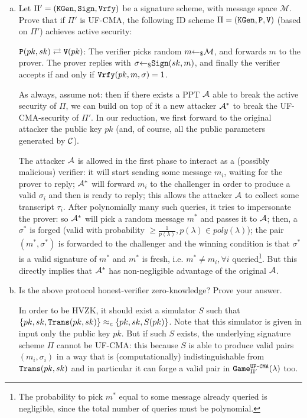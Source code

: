 \begin{enumerate}[(a)]
	\item Let $\Pi' = (\texttt{KGen}, \texttt{Sign}, \texttt{Vrfy})$ be a signature scheme, with message space $\mathcal{M}$. Prove that if $\Pi'$ is UF-CMA, the following ID scheme $\Pi = (\texttt{KGen}, \texttt{P}, \texttt{V})$ (based on $\Pi'$) achieves active security:

	      $\texttt{P}(pk, sk) \rightleftarrows \texttt{V}(pk)$: The verifier picks random $m {\leftarrow_\$} \mathcal{M}$, and forwards $m$ to the prover. The prover replies with $\sigma {\leftarrow_\$} \texttt{Sign}(sk, m)$, and finally the verifier accepts if and only if $\texttt{Vrfy}(pk, m, \sigma) = 1$.

	      \begin{solution}
		      As always, assume not: then if there exists a PPT $\mathcal{A}$ able to break the active security of $\Pi$, we can build on top of it a new attacker $\mathcal{A}^*$ to break the UF-CMA-security of $\Pi'$.	In our reduction, we first forward to the original attacker the public key $pk$ (and, of course, all the public parameters generated by $\mathcal{C}$).

		      The attacker $\mathcal{A}$ is allowed in the first phase to interact as a (possibly malicious) verifier: it will start sending some message $m_i$, waiting for the prover to reply; $\mathcal{A}^*$ will forward $m_i$ to the challenger in order to produce a valid $\sigma_i$ and then is ready to reply; this allows the attacker $\mathcal{A}$ to collect some transcript $\tau_i$. After polynomially many such queries, it tries to impersonate the prover: so $\mathcal{A}^*$ will pick a random message $m^*$ and passes it to $\mathcal{A}$; then, a $\sigma^*$ is forged (valid with probability $\ge \frac{1}{p(\lambda)}, p(\lambda) \in poly(\lambda)$); the pair $(m^*, \sigma^*)$ is forwarded to the challenger and the winning condition is that $\sigma^*$ is a valid signature of $m^*$ and $m^*$ is fresh, i.e. $m^* \ne m_i, \forall i$ queried\footnote{The probability to pick $m^*$ equal to some message already queried is negligible, since the total number of queries must be polynomial.}. But this directly implies that $\mathcal{A}^*$ has non-negligible advantage of the original $\mathcal{A}$.
	      \end{solution}

	\item Is the above protocol honest-verifier zero-knowledge? Prove your answer.

	      \begin{solution}
		      In order to be HVZK, it should exist a simulator $S$ such that $\{pk, sk, \texttt{Trans}(pk, sk)\} \approx_c \{pk, sk, S(pk)\}$. Note that this simulator is given in input only the public key $pk$. But if such $S$ exists, the underlying signature scheme $\Pi$ cannot be UF-CMA: this because $S$ is able to produce valid pairs $(m_i, \sigma_i)$ in a way that is (computationally) indistinguishable from $\texttt{Trans}(pk, sk)$ and in particular it can forge a valid pair in $\texttt{Game}_{\Pi'}^\texttt{UF-CMA}(\lambda)$ too.


\end{solution}
\end{enumerate}
